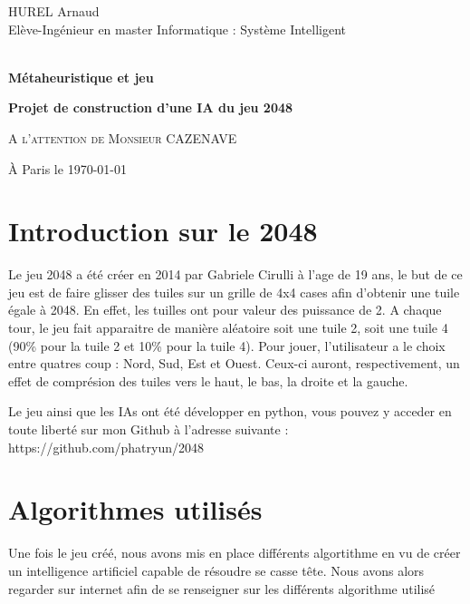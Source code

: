 \documentclass[11pt,a4paper]{article}
\begin{document}
\begin{center}
HUREL Arnaud\\
Elève-Ingénieur en master  Informatique : Système Intelligent      
\vspace{3cm}



{\textbf{\Huge{\\Métaheuristique et jeu\\}}}
\vspace{1cm}


{\textbf{\Large{Projet de construction d'une IA du jeu 2048\\}}}
\vspace{4cm}

\textsc{{\large{A l'attention de Monsieur CAZENAVE\\}}}


\vspace{4cm}
À Paris le \today
\end{center}
\newpage

\tableofcontents
\newpage

\section{Introduction sur le 2048}
Le jeu 2048 a été créer en 2014 par Gabriele Cirulli à l'age de 19 ans, le but de ce jeu est de faire glisser des tuiles sur un grille de 4x4 cases afin d'obtenir une tuile égale à 2048. En effet, les tuilles ont pour valeur des puissance de 2. A chaque tour, le jeu fait apparaitre de manière aléatoire soit une tuile 2, soit une tuile 4 (90\% pour la tuile 2 et 10\% pour la tuile 4). Pour jouer, l'utilisateur a le choix entre quatres coup : Nord, Sud, Est et Ouest. Ceux-ci auront, respectivement, un effet de comprésion des tuiles vers le haut, le bas, la droite et la gauche.

Le jeu ainsi que les IAs ont été développer en python, vous pouvez y acceder en toute liberté sur mon Github à l'adresse suivante : https://github.com/phatryun/2048


\section{Algorithmes utilisés}
Une fois le jeu créé, nous avons mis en place différents algortithme en vu de créer un intelligence artificiel capable de résoudre se casse tête. Nous avons alors regarder sur internet afin de se renseigner sur les différents algorithme utilisé
\end{document}
